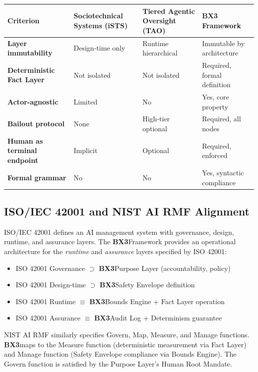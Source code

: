 \documentclass[12pt]{article}
\newcommand{\bxthree}{\textbf{BX3}}
\begin{document}
\begin{center}
\begin{tabular}{>{\bfseries}p{2.2cm} p{3.5cm} p{4.0cm} p{4.0cm}}
\toprule
\textbf{Criterion} & \textbf{Sociotechnical Systems (iSTS)} & \textbf{Tiered Agentic Oversight (TAO)} & \textbf{BX3 Framework} \\
\midrule
Layer immutability & Design-time only & Runtime hierarchical & Immutable by architecture \\
Deterministic Fact Layer & Not isolated & Not isolated & Required, formal definition \\
Actor-agnostic & Limited & No & Yes, core property \\
Bailout protocol & None & High-tier optional & Required, all nodes \\
Human as terminal endpoint & Implicit & Optional & Required, enforced \\
Formal grammar & No & No & Yes, syntactic compliance \\
\bottomrule
\end{tabular}
\end{center}

\subsection{ISO/IEC 42001 and NIST AI RMF Alignment}
ISO/IEC 42001 \cite{iso2023} defines an AI management system with governance, design, runtime, and assurance layers. The \bxthree Framework provides an operational architecture for the \textit{runtime} and \textit{assurance} layers specified by ISO 42001:

\begin{itemize}
\item ISO 42001 Governance $\supset$ \bxthree Purpose Layer (accountability, policy)
\item ISO 42001 Design-time $\supset$ \bxthree Safety Envelope definition
\item ISO 42001 Runtime $\equiv$ \bxthree Bounds Engine + Fact Layer operation
\item ISO 42001 Assurance $\equiv$ \bxthree Audit Log + Determinism guarantee
\end{itemize}

NIST AI RMF \cite{nist2023} similarly specifies Govern, Map, Measure, and Manage functions. \bxthree maps to the Measure function (deterministic measurement via Fact Layer) and Manage function (Safety Envelope compliance via Bounds Engine). The Govern function is satisfied by the Purpose Layer's Human Root Mandate.
\end{document}
